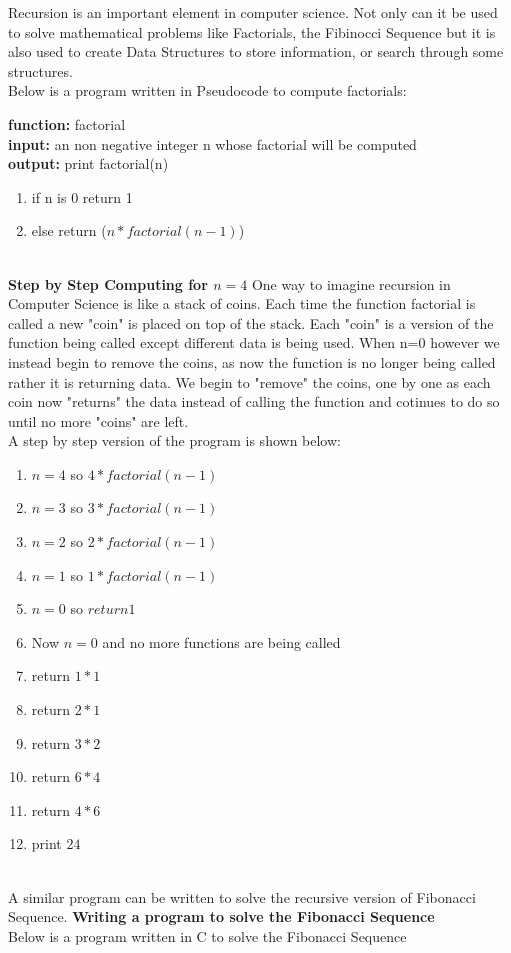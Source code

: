 \documentclass{article}
\begin{document}
Recursion is an important element in computer science. Not only can it be used to solve mathematical problems like Factorials, the Fibinocci Sequence but it is also used to create Data Structures to store information, or search through some structures. 
\\Below is a program written in Pseudocode to compute factorials:
\begin{center}
	{\bf function:} factorial
	\\
	{\bf input:} an non negative integer n whose factorial will be computed
	\\
	{\bf output:} print factorial(n)
	\begin{enumerate}
	
		\item if n is 0 return 1
		\item else return ($n * factorial(n-1)$)
	\end{enumerate}
\end{center}
~\\
{\bf Step by Step Computing for $n=4$}
One way to imagine recursion in Computer Science is like a stack of coins. Each time the function factorial is called a new "coin" is placed on top of the stack. Each "coin" is a version of the function being called except different data is being used.  When n=0 however we instead begin to remove the coins, as now the function is no longer being called rather it is returning data. We begin to "remove" the coins, one by one as each coin now "returns" the data instead of calling the function and cotinues to do so until no more "coins" are left.
\\
A step by step version of the program is shown below:
\begin{enumerate}
	\item $n=4$ so $4* factorial(n-1)$
	\item $n=3$ so $3* factorial(n-1)$
	\item $n=2$ so $2* factorial(n-1)$
	\item $n=1$ so $1* factorial(n-1)$
	\item $n=0$ so $return 1$
	\item Now $n=0$ and no more functions are being called 
	\item return $1*1$
	\item return $2*1$
	\item return $3*2$
	\item return $6*4$
	\item return $4*6$
	\item print $24$
\end{enumerate}
~\\A similar program can be written to solve the recursive version of Fibonacci Sequence.  
{\bf Writing a program to solve the Fibonacci Sequence}
\\
Below is a program written in C to solve the Fibonacci Sequence 
\\
\end{document}
